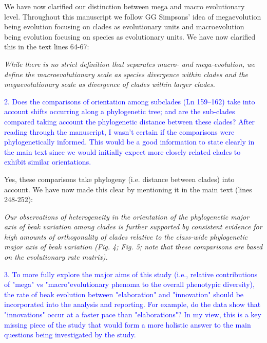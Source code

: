 \documentclass[12pt,letterpaper]{article}
\begin{document}
{We have now clarified our distinction between mega and macro evolutionary level. Throughout this manuscript we follow GG Simpsons’ idea of megaevolution being evolution focusing on clades as evolutionary units and macroevolution being evolution focusing on species as evolutionary units. We have now clarified this in the text lines 64-67:

\noindent\textit{While there is no strict definition that separates macro- and mega-evolution, we define the macroevolutionary scale as species divergence within clades and the megaevolutionary scale as divergence of clades within larger clades. }%

\textcolor{blue}{2. Does the comparisons of orientation among subclades (Ln 159–162) take into account shifts occurring along a phylogenetic tree; and are the sub-clades compared taking account the phylogenetic distance between these clades? After reading through the manuscript, I wasn't certain if the comparisons were phylogenetically informed. This would be a good information to state clearly in the main text since we would initially expect more closely related clades to exhibit similar orientations.}

Yes, these comparisons take phylogeny (i.e. distance between clades) into account. We have now made this clear by mentioning it in the main text (lines 248-252):  %

\noindent\textit{Our observations of heterogeneity in the orientation of the phylogenetic major axis of beak variation among clades is further supported by consistent evidence for high amounts of orthogonality of clades relative to the class-wide phylogenetic major axis of beak variation (Fig. 4; Fig. 5; note that these comparisons are based on the evolutionary rate matrix).} %

\textcolor{blue}{3. To more fully explore the major aims of this study (i.e., relative contributions of "mega" vs "macro"evolutionary phenoma to the overall phenotypic diversity), the rate of beak evolution between "elaboration" and "innovation" should be incorporated into the analysis and reporting. For example, do the data show that "innovations" occur at a faster pace than "elaborations"? In my view, this is a key missing piece of the study that would form a more holistic answer to the main questions being investigated by the study.}

}
\end{document}
